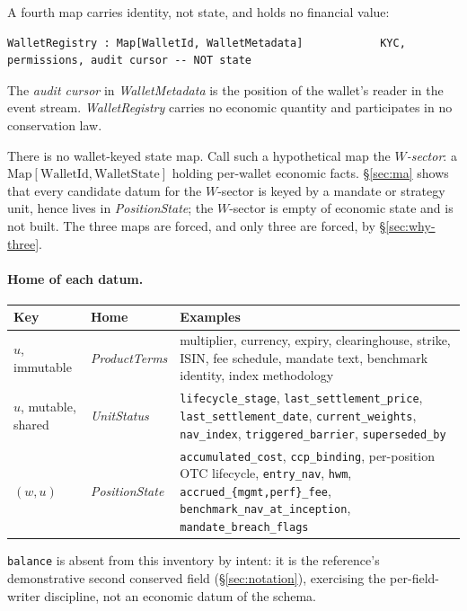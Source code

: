 \documentclass[11pt,a4paper]{article}
\begin{document}
\noindent A fourth map carries identity, not state, and holds no financial value:

\begin{lstlisting}[language={}]
WalletRegistry : Map[WalletId, WalletMetadata]            KYC, permissions, audit cursor -- NOT state
\end{lstlisting}

\noindent The \emph{audit cursor} in \emph{WalletMetadata} is the position of the wallet's
reader in the event stream. \emph{WalletRegistry} carries no economic quantity and
participates in no conservation law.

There is no wallet-keyed state map. Call such a hypothetical map the \emph{$W$-sector}: a
$\mathrm{Map}[\mathrm{WalletId},\mathrm{WalletState}]$ holding per-wallet economic facts.
\S\ref{sec:ma} shows that every candidate datum for the $W$-sector is keyed by a mandate or
strategy unit, hence lives in \emph{PositionState}; the $W$-sector is empty of economic
state and is not built. The three maps are forced, and only three are forced, by
\S\ref{sec:why-three}.

\paragraph{Home of each datum.}
\begin{longtable}{p{3.4cm}p{2.6cm}p{8.4cm}}
\toprule
\textbf{Key} & \textbf{Home} & \textbf{Examples} \\
\midrule
$u$, immutable & \emph{ProductTerms} & multiplier, currency, expiry, clearinghouse, strike,
ISIN, fee schedule, mandate text, benchmark identity, index methodology \\
\addlinespace
$u$, mutable, shared & \emph{UnitStatus} & \texttt{lifecycle\_stage},
\texttt{last\_settlement\_price}, \texttt{last\_settlement\_date},
\texttt{current\_weights}, \texttt{nav\_index}, \texttt{triggered\_barrier},
\texttt{superseded\_by} \\
\addlinespace
$(w,u)$ & \emph{PositionState} & \texttt{accumulated\_cost}, \texttt{ccp\_binding},
per-position OTC lifecycle, \texttt{entry\_nav}, \texttt{hwm},
\texttt{accrued\_\{mgmt,perf\}\_fee}, \texttt{benchmark\_nav\_at\_inception},
\texttt{mandate\_breach\_flags} \\
\bottomrule
\end{longtable}

\noindent \texttt{balance} is absent from this inventory by intent: it is the reference's
demonstrative second conserved field (\S\ref{sec:notation}), exercising the per-field-writer
discipline, not an economic datum of the schema.
\end{document}
